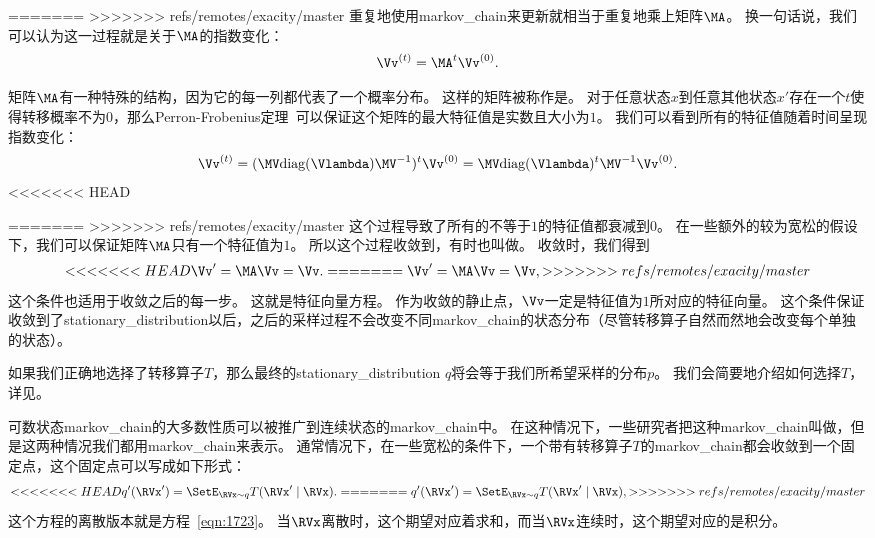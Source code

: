 =======
>>>>>>> refs/remotes/exacity/master
重复地使用\gls{markov_chain}来更新就相当于重复地乘上矩阵$\MA$。
换一句话说，我们可以认为这一过程就是关于$\MA$的指数变化：
\begin{align}
\Vv^{(t)} = \MA^{t} \Vv^{(0)}.
\end{align}


矩阵$\MA$有一种特殊的结构，因为它的每一列都代表了一个概率分布。
这样的矩阵被称作是。
对于任意状态$x$到任意其他状态$x'$存在一个$t$使得转移概率不为$0$，那么Perron-Frobenius定理~\citep{perron1907theorie,frobenius1908matrizen}可以保证这个矩阵的最大特征值是实数且大小为$1$。
我们可以看到所有的特征值随着时间呈现指数变化：
\begin{align}
\Vv^{(t)} = (\MV \text{diag}(\Vlambda)\MV^{-1})^{t} \Vv^{(0)} = \MV \text{diag}(\Vlambda)^t \MV^{-1} \Vv^{(0)}.
\end{align}
<<<<<<< HEAD


=======
>>>>>>> refs/remotes/exacity/master
这个过程导致了所有的不等于$1$的特征值都衰减到$0$。
在一些额外的较为宽松的假设下，我们可以保证矩阵$\MA$只有一个特征值为$1$。
所以这个过程收敛到，有时也叫做。
收敛时，我们得到
\begin{align}
\label{eqn:1723}
<<<<<<< HEAD
\Vv ' = \MA \Vv = \Vv .
=======
\Vv ' = \MA \Vv = \Vv,
>>>>>>> refs/remotes/exacity/master
\end{align}
这个条件也适用于收敛之后的每一步。
这就是特征向量方程。
作为收敛的静止点，$\Vv$一定是特征值为$1$所对应的特征向量。
这个条件保证收敛到了\gls{stationary_distribution}以后，之后的采样过程不会改变不同\gls{markov_chain}的状态分布（尽管转移算子自然而然地会改变每个单独的状态）。

如果我们正确地选择了转移算子$T$，那么最终的\gls{stationary_distribution} $q$将会等于我们所希望采样的分布$p$。
我们会简要地介绍如何选择$T$，详见。


可数状态\gls{markov_chain}的大多数性质可以被推广到连续状态的\gls{markov_chain}中。
在这种情况下，一些研究者把这种\gls{markov_chain}叫做，但是这两种情况我们都用\gls{markov_chain}来表示。
通常情况下，在一些宽松的条件下，一个带有转移算子$T$的\gls{markov_chain}都会收敛到一个固定点，这个固定点可以写成如下形式：
\begin{align}
<<<<<<< HEAD
q' (\RVx') = \SetE_{\RVx\sim q}T(\RVx'\mid \RVx).
=======
q' (\RVx') = \SetE_{\RVx\sim q}T(\RVx'\mid \RVx),
>>>>>>> refs/remotes/exacity/master
\end{align}
这个方程的离散版本就是方程~\eqref{eqn:1723}。	
当$\RVx$离散时，这个期望对应着求和，而当$\RVx$连续时，这个期望对应的是积分。



